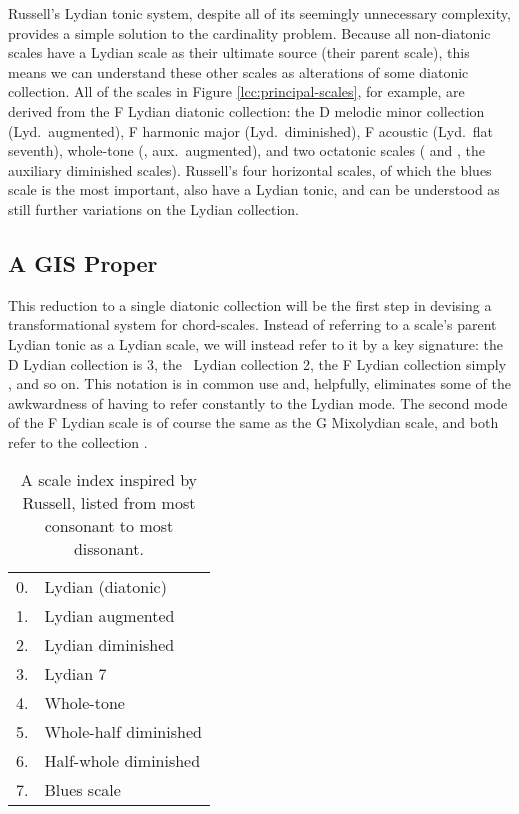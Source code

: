 Russell's Lydian tonic system, despite all of its seemingly unnecessary
complexity, provides a simple solution to the cardinality problem. Because
all non-diatonic scales have a Lydian scale as their ultimate source (their
parent scale), this means we can understand these other scales as alterations
of some diatonic collection. All of the scales in Figure
\ref{lcc:principal-scales}, for example,
are derived from the F Lydian diatonic collection: the D melodic minor
collection (Lyd.\ augmented), F harmonic major (Lyd.\ diminished), F acoustic
(Lyd.\ flat seventh), whole-tone (, aux.\ augmented), and
two octatonic scales ( and , the
auxiliary diminished scales). Russell's four horizontal scales, of which the
blues scale is the most important, also have a Lydian tonic, and can be
understood as still further variations on the Lydian collection.

\subsection{A GIS Proper}
\label{subsec:chord-scale-gis}

This reduction to a single diatonic collection will be the first step in
devising a transformational system for chord-scales. Instead of referring to a
scale's parent Lydian tonic as a Lydian scale, we will instead refer to it by
a key signature: the D Lydian collection is 3\sharp, the \Eflat\
Lydian collection 2\flat, the F Lydian collection simply \nat, and so on.
This notation is in common use and, helpfully, eliminates some of the
awkwardness of having to refer constantly to the Lydian mode. The second mode
of the F Lydian scale is of course the same as the G Mixolydian scale, and
both refer to the collection \nat.

\begin{table}[tbp]
  \centering
  \begin{tabular}{rl}
    0. & Lydian (diatonic) \\
    1. & Lydian augmented \\
    2. & Lydian diminished \\
    3. & Lydian \flat{}7 \\
    4. & Whole-tone \\
    5. & Whole-half diminished \\
    6. & Half-whole diminished \\
    7. & Blues scale
  \end{tabular}
  \caption{A scale index inspired by Russell, listed from most consonant to
    most dissonant.}
  \label{cst:scale-index}
\end{table}

